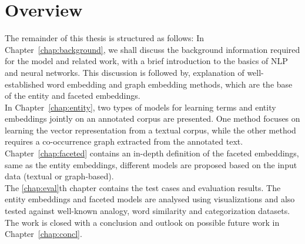 \section{Overview}
The remainder of this thesis is structured as follows: 
In Chapter~\ref{chap:background},  we shall discuss the background information required for the model and related work, with a brief introduction to the basics of NLP and neural networks. This discussion is followed by, explanation of well-established word embedding and graph embedding methods, which are the base of the entity and faceted embeddings.\\
 In Chapter~\ref{chap:entity}, two types of models for learning terms and entity embeddings jointly on an annotated corpus are presented. One method focuses on learning the vector representation from a textual corpus, while the other method requires a co-occurrence graph extracted from the annotated text.\\
Chapter~\ref{chap:faceted} contains an in-depth definition of the faceted embeddings, same as the entity embeddings, different models are proposed based on the input data (textual or graph-based). \\
The \ref{chap:eval}th chapter contains the test cases and evaluation results. The entity embeddings and faceted models are analysed using visualizations and also tested against well-known analogy, word similarity and categorization datasets. \\
The work is closed with a conclusion and outlook on possible future work in Chapter~\ref{chap:concl}. 





